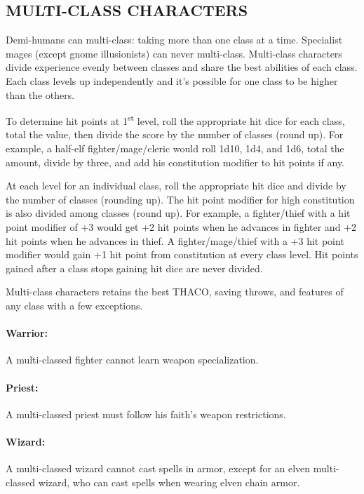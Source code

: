 \begin{multicols}{2}
\section{MULTI-CLASS CHARACTERS}

Demi-humans can multi-class: taking more than one class at a time.  Specialist mages (except gnome illusionists) can never multi-class.  Multi-class characters divide experience evenly between classes and share the best abilities of each class.  Each class levels up independently and it's possible for one class to be higher than the others.

To determine hit points at 1\textsuperscript{st} level, roll the appropriate hit dice for each class, total the value, then divide the score by the number of classes (round up).  For example, a half-elf fighter/mage/cleric would roll 1d10, 1d4, and 1d6, total the amount, divide by three, and add his constitution modifier to hit points if any.  

At each level for an individual class, roll the appropriate hit dice and divide by the number of classes (rounding up).  The hit point modifier for high constitution is also divided among classes (round up).  For example, a fighter/thief with a hit point modifier of +3 would get +2 hit points when he advances in fighter and +2 hit points when he advances in thief.  A fighter/mage/thief with a +3 hit point modifier would gain +1 hit point from constitution at every class level.  Hit points gained after a class stops gaining hit dice are never divided.

Multi-class characters retains the best THACO, saving throws, and features of any class with a few exceptions.  

\paragraph{Warrior:} A multi-classed fighter cannot learn weapon specialization.

\paragraph{Priest:} A multi-classed priest must follow his faith's weapon restrictions.

\paragraph{Wizard:} A multi-classed wizard cannot cast spells in armor, except for an elven multi-classed wizard, who can cast spells when wearing elven chain armor.


\end{multicols}
